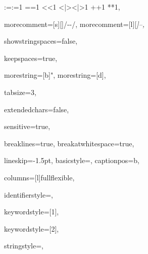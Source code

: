 {{:=}{{\color{symbolcolor}:=}}1
{=}{{\color{symbolcolor}=}}1
{<}{{\color{symbolcolor}<}}1
{<|>}{{\color{symbolcolor}<|>}}1
{+}{{\color{symbolcolor}+}}1
{*}{{\color{symbolcolor}*}}1,

morecomment=[s][\color{commentcolor}]{/-}{-/},
morecomment=[l][\itshape \color{commentcolor}]{--},

showstringspaces=false,

keepspaces=true,

morestring=[b]",
morestring=[d],

tabsize=3,

extendedchars=false,

sensitive=true,

breaklines=true,
breakatwhitespace=true,

lineskip={-1.5pt},
basicstyle={\ttfamily{}},%
captionpos=b,

columns=[l]fullflexible,


identifierstyle={\ttfamily\color{black}},

keywordstyle=[1]{\ttfamily\color{keywordcolor}},

keywordstyle=[2]{\ttfamily\color{sortcolor}},



stringstyle=\ttfamily,


}
